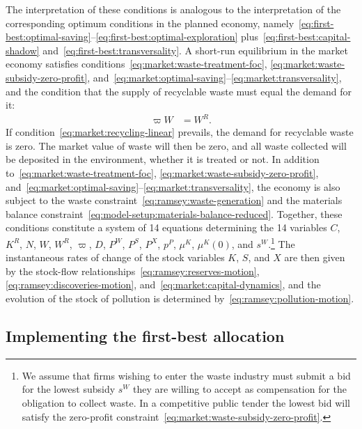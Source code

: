 The interpretation of these conditions is analogous to the interpretation of the corresponding optimum conditions in the planned economy, namely~\eqref{eq:first-best:optimal-saving}--\eqref{eq:first-best:optimal-exploration} plus~\eqref{eq:first-best:capital-shadow} and~\eqref{eq:first-best:transversality}. A short-run equilibrium in the market economy satisfies conditions~\eqref{eq:market:waste-treatment-foc}, \eqref{eq:market:waste-subsidy-zero-profit}, and~\eqref{eq:market:optimal-saving}--\eqref{eq:market:transversality}, and the condition that the supply of recyclable waste must equal the demand for it:
\begin{align}
\varpi W &= W^R.
\label{eq:market:market-clearing}
\end{align}
If condition~\eqref{eq:market:recycling-linear} prevails, the demand for recyclable waste is zero. The market value of waste will then be zero, and all waste collected will be deposited in the environment, whether it is treated or not. In addition to~\eqref{eq:market:waste-treatment-foc}, \eqref{eq:market:waste-subsidy-zero-profit}, and~\eqref{eq:market:optimal-saving}--\eqref{eq:market:transversality}, the economy is also subject to the waste constraint~\eqref{eq:ramsey:waste-generation} and the materials balance constraint~\eqref{eq:model-setup:materials-balance-reduced}. Together, these conditions constitute a system of 14 equations determining the 14 variables $C$, $K^R$, $N$, $W$, $W^R$, $\varpi$, $D$, $P^W$, $P^S$, $P^X$, $p^P$, $\mu^K$, $\mu^K(0)$, and $s^W$.\footnote{We assume that firms wishing to enter the waste industry must submit a bid for the lowest subsidy $s^W$ they are willing to accept as compensation for the obligation to collect waste. In a competitive public tender the lowest bid will satisfy the zero-profit constraint~\eqref{eq:market:waste-subsidy-zero-profit}.} The instantaneous rates of change of the stock variables $K$, $S$, and $X$ are then given by the stock-flow relationships~\eqref{eq:ramsey:reserves-motion}, \eqref{eq:ramsey:discoveries-motion}, and~\eqref{eq:market:capital-dynamics}, and the evolution of the stock of pollution is determined by~\eqref{eq:ramsey:pollution-motion}.

\subsection{Implementing the first-best allocation}
\label{subsec:market-implementation:implementation}

